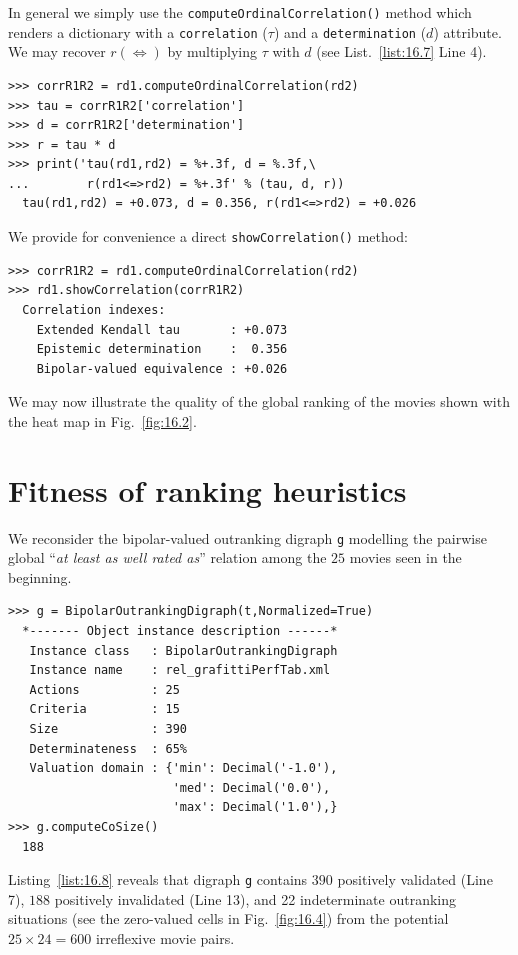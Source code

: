 In general we simply use the \texttt{computeOrdinalCorrelation()} method which renders a dictionary with a \texttt{correlation} ($\tau$) and a \texttt{determination} ($d$) attribute. We may recover $r(\Leftrightarrow)$ by multiplying $\tau$ with $d$ (see List.~\vref{list:16.7} Line 4). 
\begin{lstlisting}[caption={Computing the valued ordinal correlation index},label=list:16.7]
>>> corrR1R2 = rd1.computeOrdinalCorrelation(rd2)
>>> tau = corrR1R2['correlation']
>>> d = corrR1R2['determination']
>>> r = tau * d
>>> print('tau(rd1,rd2) = %+.3f, d = %.3f,\
...        r(rd1<=>rd2) = %+.3f' % (tau, d, r))
  tau(rd1,rd2) = +0.073, d = 0.356, r(rd1<=>rd2) = +0.026
\end{lstlisting}

We provide for convenience a direct \texttt{showCorrelation()} method:
\begin{lstlisting}
>>> corrR1R2 = rd1.computeOrdinalCorrelation(rd2)
>>> rd1.showCorrelation(corrR1R2)
  Correlation indexes:
    Extended Kendall tau       : +0.073
    Epistemic determination    :  0.356
    Bipolar-valued equivalence : +0.026
\end{lstlisting}

We may now illustrate the quality of the global ranking of the movies shown with the heat map in Fig.~\vref{fig:16.2}. 

\section{Fitness of ranking heuristics}
\label{sec:16.3}

We reconsider the bipolar-valued outranking digraph \texttt{g} modelling the pairwise global ``\emph{at least as well rated as}'' relation among the $25$ movies seen in the beginning.

\begin{lstlisting}[caption={Global movies outranking digraph},label=list:16.8]
>>> g = BipolarOutrankingDigraph(t,Normalized=True)
  *------- Object instance description ------*
   Instance class   : BipolarOutrankingDigraph
   Instance name    : rel_grafittiPerfTab.xml
   Actions          : 25
   Criteria         : 15
   Size             : 390
   Determinateness  : 65%
   Valuation domain : {'min': Decimal('-1.0'),
                       'med': Decimal('0.0'),
                       'max': Decimal('1.0'),}
>>> g.computeCoSize()
  188
\end{lstlisting}
Listing~\vref{list:16.8} reveals that digraph \texttt{g} contains $390$ positively validated (Line 7), $188$ positively invalidated (Line 13), and 22 indeterminate outranking situations (see the zero-valued cells in Fig.~\vref{fig:16.4}) from the potential $25 \times 24 = 600$ irreflexive movie pairs.


